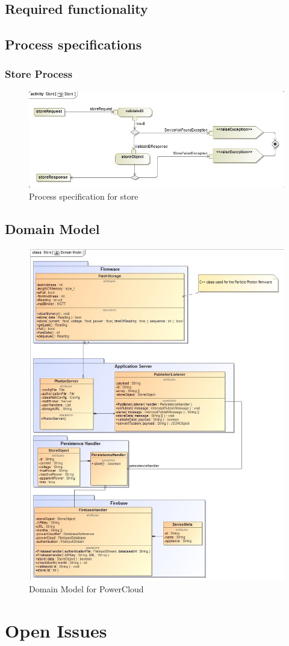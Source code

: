 \documentclass{article}
\begin{document}
	\subsection{Required functionality}
	\subsection{Process specifications}
	\subsubsection{Store Process}
	\begin{figure}[H]
		\includegraphics[width=\textwidth]{images/Store.jpg}
		\caption{Process specification for store \label{overflow}}
	\end{figure}
	\subsection{Domain Model}
	\begin{figure}[H]
		\includegraphics[width=\textwidth]{images/Domain Model.jpg}
		\caption{Domain Model for PowerCloud \label{overflow}}
	\end{figure}
	\section{Open Issues}
\end{document}
